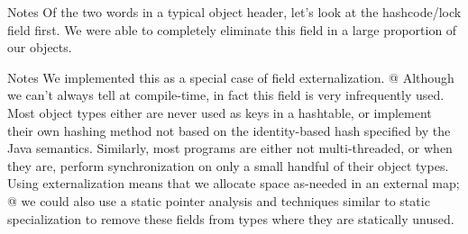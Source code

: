 \documentclass[%
pdf,
colorBG,
slideColor,
nototal,
oqe
]{prosper}
\newenvironment{talknotes}{\begin{slide}{Notes}\tiny}{\end{slide}}
\begin{document}
\begin{talknotes}
Of the two words in a typical object header, let's look at the
hashcode/lock field first.  We were able to completely eliminate this
field in a large proportion of our objects.
\end{talknotes}


\begin{talknotes}
We implemented this as a special case of field externalization.
@ Although we can't always tell at compile-time, in fact this field
is very infrequently used.  Most object types either are never used as keys
in a hashtable, or implement their own hashing method not based on the
identity-based hash specified by the Java semantics.  Similarly, most
programs are either not multi-threaded, or when they are, perform
synchronization on only a small handful of their object types.
Using externalization means that we
allocate space as-needed in an external map; @ we could also use
a static pointer analysis and techniques similar to static
specialization to remove these fields from types where they
are statically unused.
\end{talknotes}
\end{document}
